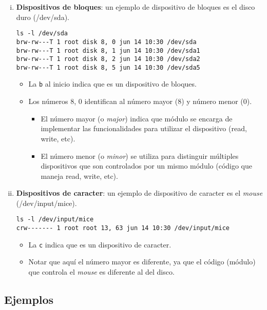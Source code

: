 \begin{enumerate}[i.]

\item \textbf{Dispositivos de bloques}: un ejemplo de dispositivo de bloques es el disco duro (/dev/sda).

\begin{verbatim}
ls -l /dev/sda
brw-rw---T 1 root disk 8, 0 jun 14 10:30 /dev/sda
brw-rw---T 1 root disk 8, 1 jun 14 10:30 /dev/sda1
brw-rw---T 1 root disk 8, 2 jun 14 10:30 /dev/sda2
brw-rw---T 1 root disk 8, 5 jun 14 10:30 /dev/sda5
\end{verbatim}

\begin{itemize}
	\item La \texttt{b} al inicio indica que es un dispositivo de bloques.
	\item Los números 8, 0 identifican al número mayor (8) y número menor (0).
	\begin{itemize}
		\item El número mayor (o \textit{major}) indica que módulo se encarga de implementar las funcionalidades para utilizar el dispositivo (read, write, etc).
		\item	El número menor (o \textit{minor}) se utiliza para distinguir múltiples dispositivos que son controlados por un mismo módulo (código que maneja read, write, etc).
	\end{itemize}
\end{itemize}

\item \textbf{Dispositivos de caracter}: un ejemplo de dispositivo de caracter es el \textit{mouse} (/dev/input/mice).

\begin{verbatim}
ls -l /dev/input/mice 
crw------- 1 root root 13, 63 jun 14 10:30 /dev/input/mice
\end{verbatim}

\begin{itemize}
	\item La \texttt{c} indica que es un dispositivo de caracter.
	\item Notar que aquí el número mayor es diferente, ya que el código (módulo) que controla el \textit{mouse} es diferente al del disco.
\end{itemize}

\end{enumerate}

\subsection{Ejemplos}

